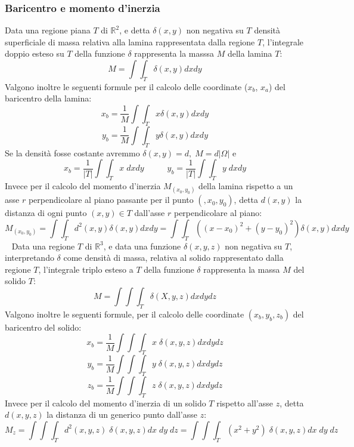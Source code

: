 \subsubsection{Baricentro e momento d'inerzia}
Data una regione piana $T$ di $\mathbb{R}^2$, e detta $\delta (x,y)$ non negativa su $T$ densità superficiale di massa relativa alla lamina rappresentata dalla regione $T$, l'integrale doppio esteso su $T$ della funzione $\delta$ rappresenta la masssa $M$ della lamina $T$:
\[
    M = \int \int_{T} \delta(x,y) dx dy
\]
Valgono inoltre le seguenti formule per il calcolo delle coordinate ($x_b$, $x_a$) del baricentro della lamina:
\[
    x_b = \frac{1}{M}\int \int_{T} x \delta(x,y)dxdy
\]
\[
    y_b= \frac{1}{M} \int \int_{T} y \delta(x,y)dxdy
\]
Se la densità fosse costante avremmo $\delta(x,y) = d, \; M = d|\Omega|$ e 
\[
    x_b = \frac{1}{|T|} \int \int_{T} x \;dxdy \;\;\;\;\;\;\;\;\;\; y_b =\frac{1}{|T|} \int \int_{T} y \;dxdy
\]
Invece per il calcolo del momento d'inerzia $M_{(x_0, y_0)}$ della lamina rispetto a un asse $r$ perpendicolare al piano passante per il punto $(,x_0, y_0)$, detta $d(x,y)$ la distanza di ogni punto $(x,y) \in T$ dall'asse $r$ perpendicolare al piano:
\[
    M_{(x_0, y_0)} =\int \int_{T}d^2(x,y) \delta(x,y) dxdy = \int \int_{T}((x-x_0)^2 + (y-y_0)^2) \delta(x,y) dxdy
\]
\ \newline
\newline
Data una regione $T$ di $\mathbb{R}^3$, e data una funzione $\delta(x,y,z)$ non negativa su $T$, interpretando $\delta$ come densità di massa, relativa al solido rappresentato dalla regione $T$, l'integrale triplo esteso a $T$ della funzione $\delta$ rappresenta la massa $M$ del solido $T$:
\[
    M = \int \int \int_{T} \delta(X,y,z)dx dy dz
\]
Valgono inoltre le seguenti formule, per il calcolo delle coordinate $(x_b, y_b, z_b)$ del baricentro del solido:
\[
    x_b = \frac{1}{M} \int \int \int_{T} x \; \delta(x,y,z) dx dy dz
\]
\[
    y_b = \frac{1}{M} \int \int \int_{T} y \; \delta(x,y,z)dx dy dz
\]
\[
    z_b = \frac{1}{M} \int \int \int_{T} z \; \delta(x,y,z)dx dy dz
\]
Invece per il calcolo del momento d'inerzia di un solido $T$ rispetto all'asse $z$, detta $d(x,y,z)$ la distanza di un generico punto dall'asse $z$:
\[
    M_z = \int \int \int_{T} d^2(x,y,z) \; \delta(x,y,z) dx \; dy \; dz =  \int \int \int_{T} (x^2+y^2) \; \delta(x,y,z) dx \; dy \; dz
\]
